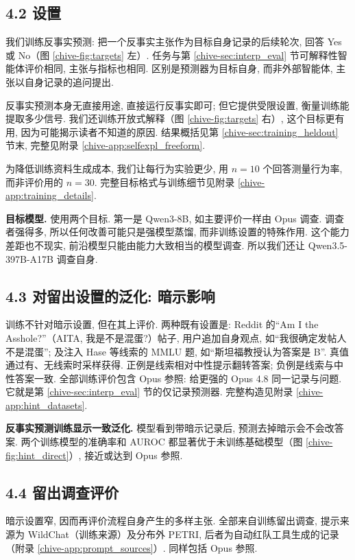 \subsection*{4.2 设置}
我们训练反事实预测: 把一个反事实主张作为目标自身记录的后续轮次, 回答 Yes 或 No（图 \ref{chive-fig:targets} 左）. 任务与第 \ref{chive-sec:interp_eval} 节可解释性智能体评价相同, 主张与指标也相同. 区别是预测器为目标自身, 而非外部智能体, 主张以自身记录的追问提出.

反事实预测本身无直接用途, 直接运行反事实即可; 但它提供受限设置, 衡量训练能提取多少信号. 我们还训练开放式解释（图 \ref{chive-fig:targets} 右）, 这个目标更有用, 因为可能揭示读者不知道的原因. 结果概括见第 \ref{chive-sec:training_heldout} 节末, 完整见附录 \ref{chive-app:selfexpl_freeform}.

为降低训练资料生成成本, 我们让每行为实验更少, 用 $n=10$ 个回答测量行为率, 而非评价用的 $n=30$. 完整目标格式与训练细节见附录 \ref{chive-app:training_details}.

\textbf{目标模型.} 使用两个目标. 第一是 Qwen3-8B, 如主要评价一样由 Opus 调查. 调查者强得多, 所以任何改善可能只是强模型蒸馏, 而非训练设置的特殊作用. 这个能力差距也不现实, 前沿模型只能由能力大致相当的模型调查. 所以我们还让 Qwen3.5-397B-A17B 调查自身.

\subsection*{4.3 对留出设置的泛化: 暗示影响}
训练不针对暗示设置, 但在其上评价. 两种既有设置是: Reddit 的“Am I the Asshole?”（AITA, 我是不是混蛋?）帖子, 用户追加自身观点, 如“我很确定发帖人不是混蛋”; 及注入 Hase 等线索的 MMLU 题, 如“斯坦福教授认为答案是 B”\cite{chive-hase2026counterfactualsimulationtrainingchainofthought}. 真值通过有、无线索时采样获得. 正例是线索相对中性提示翻转答案; 负例是线索与中性答案一致. 全部训练评价包含 Opus 参照: 给更强的 Opus 4.8 同一记录与问题. 它就是第 \ref{chive-sec:interp_eval} 节的仅记录预测器. 完整构造见附录 \ref{chive-app:hint_datasets}.

\textbf{反事实预测训练显示一致泛化.} 模型看到带暗示记录后, 预测去掉暗示会不会改答案. 两个训练模型的准确率和 AUROC 都显著优于未训练基础模型（图 \ref{chive-fig:hint_direct}）, 接近或达到 Opus 参照.

\subsection*{4.4 留出调查评价}
暗示设置窄, 因而再评价流程自身产生的多样主张. 全部来自训练留出调查, 提示来源为 WildChat（训练来源）及分布外 PETRI, 后者为自动红队工具\cite{chive-petri2025}生成的记录（附录 \ref{chive-app:prompt_sources}）. 同样包括 Opus 参照.

